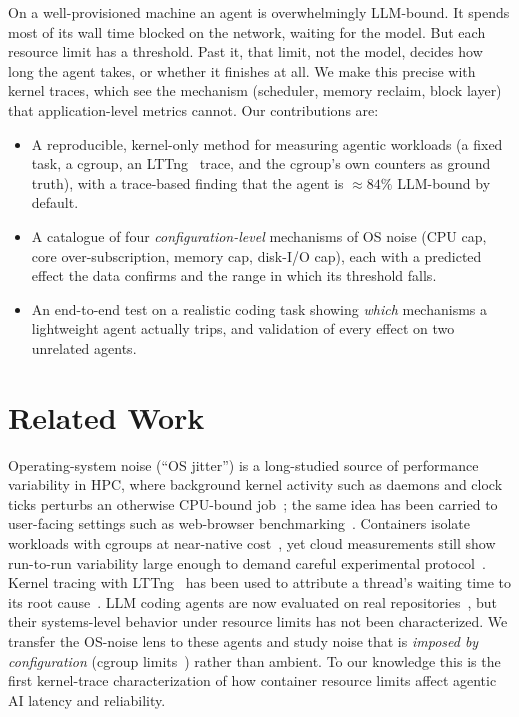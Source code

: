 \documentclass[10pt,conference]{IEEEtran}
\begin{document}
On a well-provisioned machine an agent is overwhelmingly LLM-bound. It
spends most of its wall time blocked on the network, waiting for the model.
But each resource limit has a threshold. Past it, that limit, not the model,
decides how long the agent takes, or whether it finishes at all. We make
this precise with kernel traces, which see the mechanism (scheduler, memory
reclaim, block layer) that application-level metrics cannot. Our
contributions are:
\begin{itemize}\itemsep0pt
  \item A reproducible, kernel-only method for measuring agentic workloads
  (a fixed task, a cgroup, an LTTng~\cite{desnoyers2006} trace, and the
  cgroup's own counters as ground truth), with a trace-based finding that the agent is
  ${\approx}84\%$ LLM-bound by default.
  \item A catalogue of four \emph{configuration-level} mechanisms of OS
  noise (CPU cap, core over-subscription, memory cap, disk-I/O cap), each
  with a predicted effect the data confirms and the range in which its
  threshold falls.
  \item An end-to-end test on a realistic coding task showing \emph{which}
  mechanisms a lightweight agent actually trips, and validation of every
  effect on two unrelated agents.
\end{itemize}

\section{Related Work}

Operating-system noise (``OS jitter'') is a long-studied source of
performance variability in HPC, where background kernel activity such as
daemons and clock ticks perturbs an otherwise CPU-bound
job~\cite{petrini2003,tsafrir2005,ferreira2008,hoefler2010}; the same idea
has been carried to user-facing settings such as web-browser
benchmarking~\cite{larres2013}. Containers isolate workloads with cgroups
at near-native cost~\cite{felter2015}, yet cloud measurements still show
run-to-run variability large enough to demand careful experimental
protocol~\cite{maricq2018,mytkowicz2009,hoefler2015}. Kernel tracing with
LTTng~\cite{desnoyers2006} has been used to attribute a thread's waiting
time to its root cause~\cite{giraldeau2016,ezzati2018}. LLM coding agents
are now evaluated on real repositories~\cite{jimenez2024,yang2024}, but
their systems-level behavior under resource limits has not been
characterized. We transfer the OS-noise lens to these agents and study
noise that is \emph{imposed by configuration} (cgroup
limits~\cite{cgroupv2}) rather than ambient. To our knowledge this is the
first kernel-trace characterization of how container resource limits
affect agentic AI latency and reliability.
\end{document}
